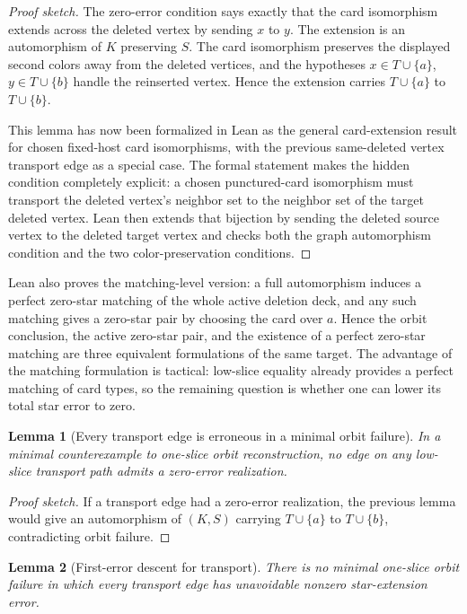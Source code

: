 \documentclass[11pt]{article}
\newtheorem{lemma}{Lemma}
\begin{document}
\begin{proof}[Proof sketch]
The zero-error condition says exactly that the card isomorphism extends across
the deleted vertex by sending \(x\) to \(y\).  The extension is an automorphism
of \(K\) preserving \(S\).  The card isomorphism preserves the displayed second
colors away from the deleted vertices, and the hypotheses \(x\in T\cup\{a\}\),
\(y\in T\cup\{b\}\) handle the reinserted vertex.  Hence the extension carries
\(T\cup\{a\}\) to \(T\cup\{b\}\).

This lemma has now been formalized in Lean as the general card-extension
result for chosen fixed-host card isomorphisms, with the previous same-deleted
vertex transport edge as a special case.  The formal statement makes the
hidden condition completely explicit: a chosen punctured-card isomorphism must
transport the deleted vertex's neighbor set to the neighbor set of the target
deleted vertex.  Lean then extends that bijection by sending the deleted source
vertex to the deleted target vertex and checks both the graph automorphism
condition and the two color-preservation conditions.
\end{proof}

Lean also proves the matching-level version: a full automorphism induces a
perfect zero-star matching of the whole active deletion deck, and any such
matching gives a zero-star pair by choosing the card over \(a\).  Hence the
orbit conclusion, the active zero-star pair, and the existence of a perfect
zero-star matching are three equivalent formulations of the same target.  The
advantage of the matching formulation is tactical: low-slice equality already
provides a perfect matching of card types, so the remaining question is whether
one can lower its total star error to zero.

\begin{lemma}[Every transport edge is erroneous in a minimal orbit failure]
In a minimal counterexample to one-slice orbit reconstruction, no edge on any
low-slice transport path admits a zero-error realization.
\end{lemma}

\begin{proof}[Proof sketch]
If a transport edge had a zero-error realization, the previous lemma would
give an automorphism of \((K,S)\) carrying \(T\cup\{a\}\) to \(T\cup\{b\}\),
contradicting orbit failure.
\end{proof}

\begin{lemma}[First-error descent for transport]
There is no minimal one-slice orbit failure in which every transport edge has
unavoidable nonzero star-extension error.
\end{lemma}
\end{document}
